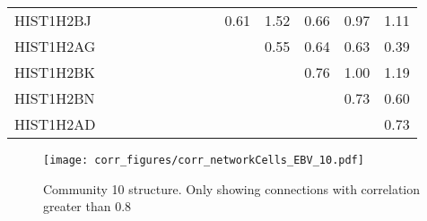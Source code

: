 \begin{longtable}{lrrrrrrrrrrrrr}
HIST1H2BJ &                 &                &                 &                 &                 &                &                &                 &            0.61 &            1.52 &            0.66 &            0.97 &        1.11 \\
HIST1H2AG &                 &                &                 &                 &                 &                &                &                 &                 &            0.55 &            0.64 &            0.63 &        0.39 \\
HIST1H2BK &                 &                &                 &                 &                 &                &                &                 &                 &                 &            0.76 &            1.00 &        1.19 \\
HIST1H2BN &                 &                &                 &                 &                 &                &                &                 &                 &                 &                 &            0.73 &        0.60 \\
HIST1H2AD &                 &                &                 &                 &                 &                &                &                 &                 &                 &                 &                 &        0.73 \\
\end{longtable}


\begin{figure}[h!]
\centering
\texttt{[image: corr\_figures/corr\_networkCells\_EBV\_10.pdf]}
\caption{Community 10 structure. Only showing connections with correlation greater than 0.8}
\end{figure}




